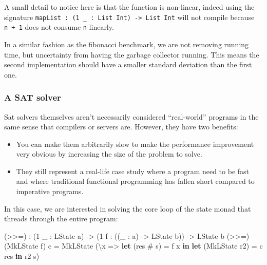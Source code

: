 \documentclass[
]{article}
\newenvironment{Shaded}{}{}
\newcommand{\DataTypeTok}[1]{\textcolor[rgb]{0.56,0.13,0.00}{#1}}
\newcommand{\DecValTok}[1]{\textcolor[rgb]{0.25,0.63,0.44}{#1}}
\newcommand{\KeywordTok}[1]{\textcolor[rgb]{0.00,0.44,0.13}{\textbf{#1}}}
\newcommand{\NormalTok}[1]{#1}
\newcommand{\OperatorTok}[1]{\textcolor[rgb]{0.40,0.40,0.40}{#1}}
\newcommand{\OtherTok}[1]{\textcolor[rgb]{0.00,0.44,0.13}{#1}}
\providecommand{\tightlist}{%
  \setlength{\itemsep}{0pt}\setlength{\parskip}{0pt}}
\begin{document}
A small detail to notice here is that the function is non-linear, indeed
using the signature
\texttt{mapList\ :\ (1\ \_\ :\ List\ Int)\ -\textgreater{}\ List\ Int}
will not compile because \texttt{n\ +\ 1} does not consume \texttt{n}
linearly.

In a similar fashion as the fibonacci benchmark, we are not removing
running time, but uncertainty from having the garbage collector running.
This means the second implementation should have a smaller standard
deviation than the first one.

\hypertarget{a-sat-solver}{%
\subsubsection{A SAT solver}\label{a-sat-solver}}

Sat solvers themselves aren't necessarily considered ``real-world''
programs in the same sense that compilers or servers are. However, they
have two benefits:

\begin{itemize}
\tightlist
\item
  You can make them arbitrarily slow to make the performance improvement
  very obvious by increasing the size of the problem to solve.
\item
  They still represent a real-life case study where a program need to be
  fast and where traditional functional programming has fallen short
  compared to imperative programs.
\end{itemize}

In this case, we are interested in solving the core loop of the state
monad that threads through the entire program:

\begin{Shaded}
\begin{Highlighting}[]
\NormalTok{(}\OperatorTok{\textgreater{}\textgreater{}=}\NormalTok{) }\OperatorTok{:}\NormalTok{ (}\DecValTok{1}\NormalTok{ \_ }\OperatorTok{:} \DataTypeTok{LState}\NormalTok{ a) }\OtherTok{{-}\textgreater{}}\NormalTok{ (}\DecValTok{1}\NormalTok{ f }\OperatorTok{:}\NormalTok{ ((\_ }\OperatorTok{:}\NormalTok{ a) }\OtherTok{{-}\textgreater{}} \DataTypeTok{LState}\NormalTok{ b))}
     \OtherTok{{-}\textgreater{}} \DataTypeTok{LState}\NormalTok{ b}
\NormalTok{(}\OperatorTok{\textgreater{}\textgreater{}=}\NormalTok{) (}\DataTypeTok{MkLState}\NormalTok{ f) c }\OtherTok{=} \DataTypeTok{MkLState} 
\NormalTok{    (\textbackslash{}x }\OtherTok{=\textgreater{}} \KeywordTok{let}\NormalTok{ (res }\OperatorTok{\#}\NormalTok{ s\textquotesingle{}) }\OtherTok{=}\NormalTok{ f x }\KeywordTok{in}
           \KeywordTok{let}\NormalTok{ (}\DataTypeTok{MkLState}\NormalTok{ r2) }\OtherTok{=}\NormalTok{ c res }\KeywordTok{in} 
\NormalTok{           r2 s\textquotesingle{})}
\end{Highlighting}
\end{Shaded}
\end{document}

